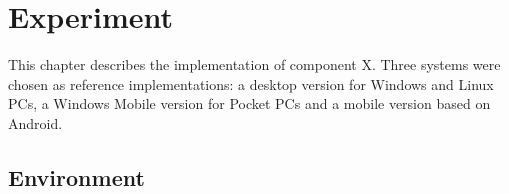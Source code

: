 \chapter{Experiment\label{cha:chapter5}}

This chapter describes the implementation of component X. Three systems were chosen as reference implementations: a desktop version for Windows and Linux PCs, a Windows Mobile version for Pocket PCs and a mobile version based on Android. 

\section{Environment\label{sec:env}}


